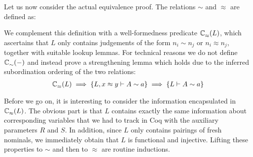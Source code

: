 \documentclass[a4paper,UKenglish]{lipics-v2016}
\newcommand{\ms}{\,}
\newcommand{\mrel}[1]{\mathrel{\ms #1 \ms}}
\newcommand{\tyr}{\mathrel{\sim}}
\newcommand{\tmr}{\mathrel{\approx}}
\newcommand{\lpPi}[1]{\mathbf{\Pi} #1.\ms\ms}
\newcommand{\lpApp}[2]{#1\langle#2\rangle}
\newcommand{\lpImp}{\mrel{=\!\blacktriangleright}}
\newcommand{\Prp}{\ensuremath{\textrm{\textasteriskcentered}}}
\newcommand{\All}{\ensuremath{\forall.\,}}
\newcommand{\Lam}[1]{\ensuremath{\lambda #1.\,}}
\newcommand{\TyLam}{\ensuremath{\Lambda.\,}}
\newcommand{\Prod}[1]{\ensuremath{\Pi #1.\,}}
\theoremstyle{plain}
\begin{document}
Let us now consider the actual equivalence proof.
The relations $\tyr$ and $\tmr$ are defined as:
We complement this definition with a well-formedness predicate $\ac{\tmr}{~}{L}$, which ascertains that $L$ only contains judgements of the form $n_i \tyr n_j$ or $n_i \tmr n_j$, together with suitable lookup lemmas.
For technical reasons we do not define $\ac{\tyr}{~}{-}$ and instead prove a strengthening lemma which holds due to the inferred subordination ordering of the two relations:
\begin{align*}
  \ac{\tmr}{~}{L} \implies \aj{L, x \tmr y}{A \tyr a} \implies \aj{L}{A \tyr a}
\end{align*}

Before we go on, it is interesting to consider the information encapsulated in $\ac{\tmr}{~}{L}$.
The obvious part is that $L$ contains exactly the same information about corresponding variables that we had to track in Coq with the auxiliary parameters $R$ and $S$.
In addition, since $L$ only contains pairings of fresh nominals, we immediately obtain that $L$ is functional and injective.
Lifting these properties to $\tyr$ and then to $\tmr$ are routine inductions.
\end{document}
